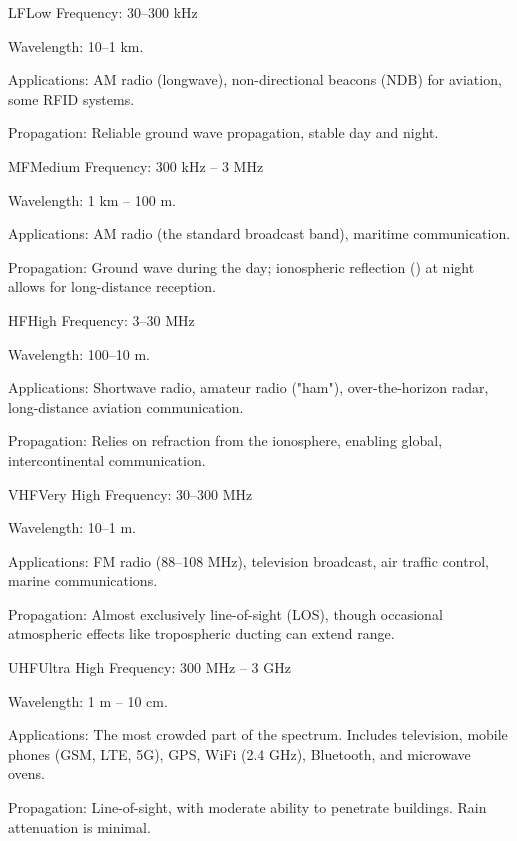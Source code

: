 \begin{spectrumband}{LF}{Low Frequency: 30--300 kHz}
     \item[Wavelength:] 10--1 km.
    \item[Applications:] AM radio (longwave), non-directional beacons (NDB) for aviation, some RFID systems.
    \item[Propagation:] Reliable ground wave propagation, stable day and night.
\end{spectrumband}

\begin{spectrumband}{MF}{Medium Frequency: 300 kHz -- 3 MHz}
    \item[Wavelength:] 1 km -- 100 m.
    \item[Applications:] AM radio (the standard broadcast band), maritime communication.
    \item[Propagation:] Ground wave during the day; ionospheric reflection () at night allows for long-distance reception.
\end{spectrumband}

\begin{spectrumband}{HF}{High Frequency: 3--30 MHz}
    \item[Wavelength:] 100--10 m.
    \item[Applications:] Shortwave radio, amateur radio ("ham"), over-the-horizon radar, long-distance aviation communication.
    \item[Propagation:] Relies on refraction from the ionosphere, enabling global, intercontinental communication.
\end{spectrumband}

\begin{spectrumband}{VHF}{Very High Frequency: 30--300 MHz}
    \item[Wavelength:] 10--1 m.
    \item[Applications:] FM radio (88--108 MHz), television broadcast, air traffic control, marine communications.
    \item[Propagation:] Almost exclusively line-of-sight (LOS), though occasional atmospheric effects like tropospheric ducting can extend range.
\end{spectrumband}

\begin{spectrumband}{UHF}{Ultra High Frequency: 300 MHz -- 3 GHz}
    \item[Wavelength:] 1 m -- 10 cm.
    \item[Applications:] The most crowded part of the spectrum. Includes television, mobile phones (GSM, LTE, 5G), GPS, WiFi (2.4 GHz), Bluetooth, and microwave ovens.
    \item[Propagation:] Line-of-sight, with moderate ability to penetrate buildings. Rain attenuation is minimal.
\end{spectrumband}

